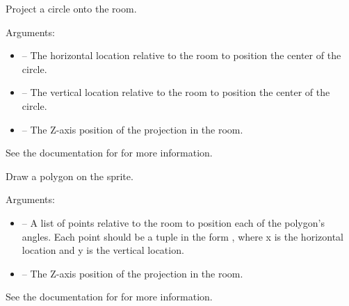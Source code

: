 \documentclass[letterpaper,10pt,english]{sphinxmanual}
\begin{document}
\begin{fulllineitems}
\label{dsp:sge.dsp.Room.project_circle}
Project a circle onto the room.

Arguments:
\begin{itemize}
\item {} 
 -- The horizontal location relative to the room to
position the center of the circle.

\item {} 
 -- The vertical location relative to the room to
position the center of the circle.

\item {} 
 -- The Z-axis position of the projection in the room.

\end{itemize}

See the documentation for {\hyperref[gfx:sge.gfx.Sprite.draw_circle]{\emph{}}} for
more information.

\end{fulllineitems}


\begin{fulllineitems}
\label{dsp:sge.dsp.Room.project_polygon}
Draw a polygon on the sprite.

Arguments:
\begin{itemize}
\item {} 
 -- A list of points relative to the room to
position each of the polygon's angles.  Each point should be a
tuple in the form , where x is the horizontal
location and y is the vertical location.

\item {} 
 -- The Z-axis position of the projection in the room.

\end{itemize}

See the documentation for {\hyperref[gfx:sge.gfx.Sprite.draw_polygon]{\emph{}}}
for more information.

\end{fulllineitems}
\end{document}
